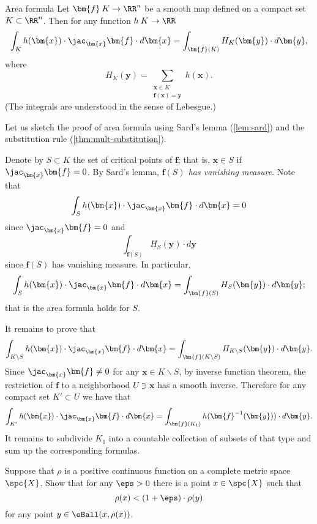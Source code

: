 \begin{thm}{Area formula}\label{thm:area-formula}
Let $\bm{f}\:K\to\RR^n$ be a smooth map defined on a compact set $K\subset \RR^n$.
Then for any function $h\:K\to \RR$
\[\int_K h(\bm{x})\cdot \jac_{\bm{x}}\bm{f}\cdot d\bm{x}=\int_{\bm{f}(K)} H_K(\bm{y})\cdot d\bm{y},\]
where 
\[H_K(\bm{y})=\sum_{\substack{\bm{x}\in K \\ \bm{f}(\bm{x})=\bm{y}}}h(\bm{x}).\]
(The integrals are understood in the sense of Lebesgue.)
\end{thm}

Let us sketch the proof of area formula using  Sard's lemma (\ref{lem:sard}) and the substitution rule (\ref{thm:mult-substitution}).

Denote by $S\subset K$ the set of critical points of $\bm{f}$; that is, $\bm{x}\in S$ if $\jac_{\bm{x}}\bm{f}=0$.
By Sard's lemma,
\emph{$\bm{f}(S)$ has vanishing measure}.
Note that 
\[\int_S h(\bm{x})\cdot \jac_{\bm{x}}\bm{f}\cdot d\bm{x}=0\]
since $\jac_{\bm{x}}\bm{f}=0$
and
\[\int_{\bm{f}(S)} H_S(\bm{y})\cdot d\bm{y}\]
since $\bm{f}(S)$ has vanishing measure.
In particular,
\[\int_S h(\bm{x})\cdot \jac_{\bm{x}}\bm{f}\cdot d\bm{x}=\int_{\bm{f}(S)} H_S(\bm{y})\cdot d\bm{y};\]
that is the area formula holds for $S$.

It remains to prove that 
\[\int_{K\backslash S} h(\bm{x})\cdot \jac_{\bm{x}}\bm{f}\cdot d\bm{x}=\int_{\bm{f}(K\backslash S)} H_{K\backslash S}(\bm{y})\cdot d\bm{y}.\]
Since $\jac_{\bm{x}}\bm{f}\ne 0$ for any $\bm{x}\in K\backslash S$, by inverse function theorem, the restriction of $\bm{f}$ to a neighborhood $U\ni\bm{x}$ has a smooth inverse.
Therefore for any compact set $K'\subset U$ we have that %
\[\int_{K'}h(\bm{x})\cdot \jac_{\bm{x}}\bm{f}\cdot d\bm{x}=\int_{\bm{f}(K_1)} h(\bm{f}^{-1}(\bm{y}))\cdot d\bm{y}.\]
It remains to subdivide $K_1$ into a countable collection of subsets of that type and sum up the corresponding formulas.\qeds

















\newpage
\pagestyle{empty}

\noindent Suppose that $\rho$ is a positive continuous function on a complete metric space $\spc{X}$.
Show that for any $\eps>0$ there is a point $x\in \spc{X}$ such that 
\[\rho(x)<(1+\eps)\cdot\rho(y)\]
for any point $y\in \oBall(x,\rho(x))$.

